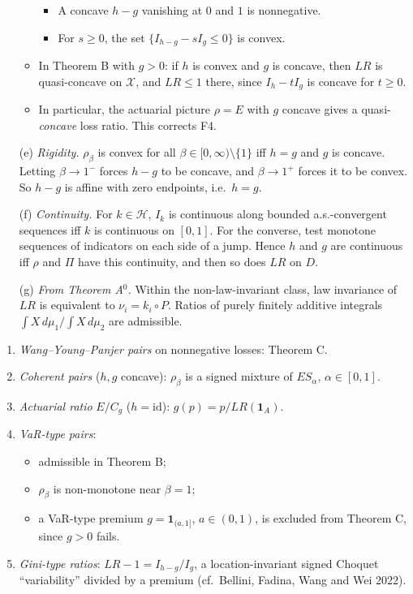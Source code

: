 \begin{corollary}
\begin{enumerate}
\begin{itemize}
\begin{itemize}
    \item A concave $h-g$ vanishing at $0$ and $1$ is nonnegative.
    \item For $s\ge0$, the set $\{I_{h-g}-sI_g\le0\}$ is convex.
    \end{itemize}
  \item In Theorem B with $g>0$: if $h$ is convex and $g$ is concave, then $LR$ is quasi-concave on $\mathcal X$, and $LR\le1$ there, since $I_h-tI_g$ is concave for $t\ge0$.
  \item In particular, the actuarial picture $\rho=E$ with $g$ concave gives a quasi-\emph{concave} loss ratio. This corrects F4.
  \end{itemize}
\item[(e)] \emph{Rigidity.} $\rho_\beta$ is convex for all $\beta\in[0,\infty)\setminus\{1\}$ iff $h=g$ and $g$ is concave. Letting $\beta\to1^-$ forces $h-g$ to be concave, and $\beta\to1^+$ forces it to be convex. So $h-g$ is affine with zero endpoints, i.e.\ $h=g$.
\item[(f)] \emph{Continuity.} For $k\in\mathcal H$, $I_k$ is continuous along bounded a.s.-convergent sequences iff $k$ is continuous on $[0,1]$. For the converse, test monotone sequences of indicators on each side of a jump. Hence $h$ and $g$ are continuous iff $\rho$ and $\Pi$ have this continuity, and then so does $LR$ on $D$.
\item[(g)] \emph{From Theorem A$^0$.} Within the non-law-invariant class, law invariance of $LR$ is equivalent to $\nu_i=k_i\circ P$. Ratios of purely finitely additive integrals $\int X\,d\mu_1/\int X\,d\mu_2$ are admissible.
\end{enumerate}
\end{corollary}

\begin{example}
\begin{enumerate}
\item \emph{Wang--Young--Panjer pairs} on nonnegative losses: Theorem C.
\item \emph{Coherent pairs} ($h,g$ concave): $\rho_\beta$ is a signed mixture of $ES_\alpha$, $\alpha\in[0,1]$.
\item \emph{Actuarial ratio} $E/C_g$ ($h=\mathrm{id}$): $g(p)=p/LR(\mathbf 1_A)$.
\item \emph{VaR-type pairs}:
  \begin{itemize}
  \item admissible in Theorem B;
  \item $\rho_\beta$ is non-monotone near $\beta=1$;
  \item a VaR-type premium $g=\mathbf 1_{(a,1]}$, $a\in(0,1)$, is excluded from Theorem C, since $g>0$ fails.
  \end{itemize}
\item \emph{Gini-type ratios}: $LR-1=I_{h-g}/I_g$, a location-invariant signed Choquet ``variability'' divided by a premium (cf.\ Bellini, Fadina, Wang and Wei 2022).
\end{enumerate}
\end{example}

